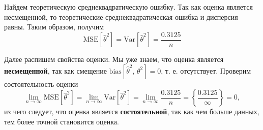 \documentclass[a4paper, 12pt]{article}
\begin{document}
    
    Найдем теоретическую среднеквадратическую ошибку. Так как оценка является несмещенной, то теоретические среднеквадратическая ошибка и дисперсия равны. Таким образом, получим
    $$\text{MSE}{\left[\hat{\theta}^2\right]}=\text{Var}{\left[\hat{\theta}^2\right]}=\dfrac{0.3125}{n}$$


    Далее распишем свойства оценки. Мы уже знаем, что оценка является \textbf{несмещенной}, так как смещение $\text{bias}{\left[\hat{\theta}^2,\,\theta^2\right]}=0$, т. е. отсутствует.
    Проверим состоятельность оценки
    $$\lim\limits_{n\rightarrow\infty}\text{MSE}{\left[\hat{\theta}^2\right]}=\lim\limits_{n\rightarrow\infty}\text{Var}{\left[\hat{\theta}^2\right]}=\lim\limits_{n\rightarrow\infty}\dfrac{0.3125}{n}=\left\{\dfrac{0.3125}{\infty}\right\}=0,$$
    из чего следует, что оценка является \textbf{состоятельной}, так как чем больше данных, тем более точной становится оценка.
\end{document}
